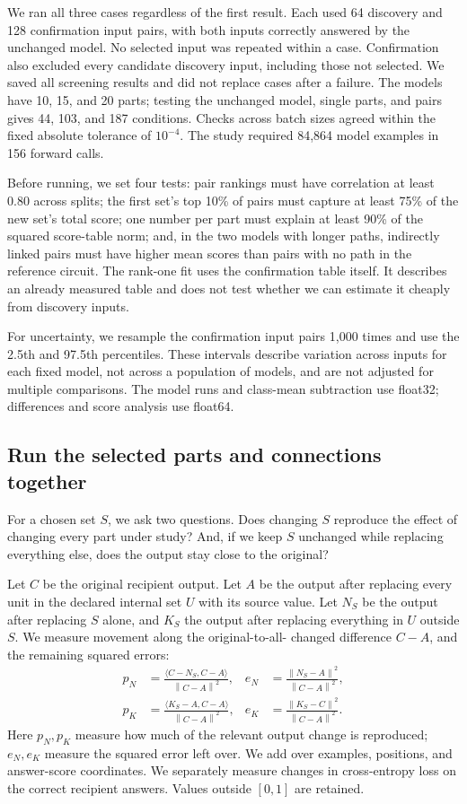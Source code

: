 \documentclass[11pt]{article}
\newcommand{\norm}[1]{\left\lVert#1\right\rVert}
\begin{document}
We ran all three cases regardless of the first result. Each used 64 discovery
and 128 confirmation input pairs, with both inputs correctly answered by the
unchanged model. No selected input was repeated within a case. Confirmation
also excluded every candidate discovery input, including those not selected.
We saved all screening results and did not replace cases after a failure.
The models have 10, 15, and 20 parts; testing the unchanged model, single parts,
and pairs gives 44, 103, and 187 conditions. Checks across batch sizes agreed
within the fixed absolute tolerance of $10^{-4}$. The study required 84,864
model examples in 156 forward calls.

Before running, we set four tests: pair rankings must have correlation at least
0.80 across splits; the first set's top 10\% of pairs must capture at least
75\% of the new set's total score; one number per part must explain at least
90\% of the squared score-table norm; and, in the two models with longer
paths, indirectly linked pairs must have higher mean scores than pairs with
no path in the reference circuit. The rank-one fit uses the confirmation
table itself. It describes an already measured table and does not test whether
we can estimate it cheaply from discovery inputs.

For uncertainty, we resample the confirmation input pairs 1,000 times and use
the 2.5th and 97.5th percentiles. These intervals describe variation across
inputs for each fixed model, not across a population of models, and are not
adjusted for multiple comparisons. The model runs and class-mean subtraction
use float32; differences and score analysis use float64.

\subsection{Run the selected parts and connections together}
For a chosen set $S$, we ask two questions. Does changing $S$ reproduce the
effect of changing every part under study? And, if we keep $S$ unchanged while
replacing everything else, does the output stay close to the original?

Let $C$ be the original recipient output. Let $A$ be the output after replacing
every unit in the declared internal set $U$ with its source value. Let $N_S$
be the output after replacing $S$ alone, and $K_S$ the output after replacing
everything in $U$ outside $S$. We measure movement along the original-to-all-
changed difference $C-A$, and the remaining squared errors:
\begin{align}
 p_N &= \frac{\langle C-N_S,C-A\rangle}{\norm{C-A}^2}, &
 e_N &= \frac{\norm{N_S-A}^2}{\norm{C-A}^2},\\
 p_K &= \frac{\langle K_S-A,C-A\rangle}{\norm{C-A}^2}, &
 e_K &= \frac{\norm{K_S-C}^2}{\norm{C-A}^2}.
\end{align}
Here $p_N,p_K$ measure how much of the relevant output change is reproduced;
$e_N,e_K$ measure the squared error left over. We add over examples, positions,
and answer-score coordinates. We separately measure changes in cross-entropy
loss on the correct recipient answers. Values outside $[0,1]$ are retained.
\end{document}
